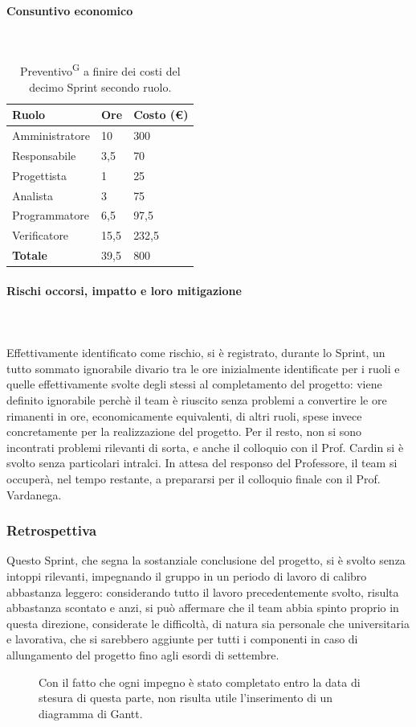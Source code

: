 \documentclass[8pt]{article}
\newcommand{\glossterm}[1]{#1\textsuperscript{G}} %
\newcommand{\subsubsubsection}[1]{\paragraph{#1}\mbox{}\\}
\begin{document}
\subsubsubsection{Consuntivo economico}
\begin{table}[ht!]
    \centering
    \begin{tabular}{p{4cm} p{1.8cm} p{2.2cm}}
        \toprule
        \textbf{Ruolo} & \textbf{Ore} & \textbf{Costo (€)} \\
        \midrule
        Amministratore & 10 & 300 \\ 
        Responsabile & 3,5 & 70 \\ 
        Progettista & 1 & 25 \\ 
        Analista & 3 &75 \\ 
        Programmatore & 6,5 & 97,5 \\ 
        Verificatore & 15,5 & 232,5 \\
        \midrule 
        \textbf{Totale} & 39,5 & 800 \\ 
        \bottomrule
    \end{tabular}
    \caption{\glossterm{Preventivo} a finire dei costi del decimo Sprint secondo ruolo.}
    \label{table:Preventivo a finire dei costi del decimo Sprint secondo ruolo}
\end{table}
\subsubsubsection{Rischi occorsi, impatto e loro mitigazione} \\
Effettivamente identificato come rischio, si è registrato, durante lo Sprint, un tutto sommato ignorabile divario tra le ore inizialmente identificate per i ruoli e quelle effettivamente svolte degli stessi al completamento del progetto: viene definito ignorabile perchè il team è riuscito senza problemi a convertire le ore rimanenti in ore, economicamente equivalenti, di altri ruoli, spese invece concretamente per la realizzazione del progetto. Per il resto, non si sono incontrati problemi rilevanti di sorta, e anche il colloquio con il Prof. Cardin si è svolto senza particolari intralci. In attesa del responso del Professore, il team si occuperà, nel tempo restante, a prepararsi per il colloquio finale con il Prof. Vardanega.
\subsubsection{Retrospettiva}
Questo Sprint, che segna la sostanziale conclusione del progetto, si è svolto senza intoppi rilevanti, impegnando il gruppo in un periodo di lavoro di calibro abbastanza leggero: considerando tutto il lavoro precedentemente svolto, risulta abbastanza scontato e anzi, si può affermare che il team abbia spinto proprio in questa direzione, considerate le difficoltà, di natura sia personale che universitaria e lavorativa, che si sarebbero aggiunte  per tutti i componenti in caso di allungamento del progetto fino agli esordi di settembre.   
\begin{figure}[htbp]
    \centering
    \captionsetup{justification=centering}
    \caption*{Con il fatto che ogni impegno è stato completato entro la data di stesura di questa parte, non risulta utile l'inserimento di un diagramma di Gantt.}
\end{figure}
\end{document}
